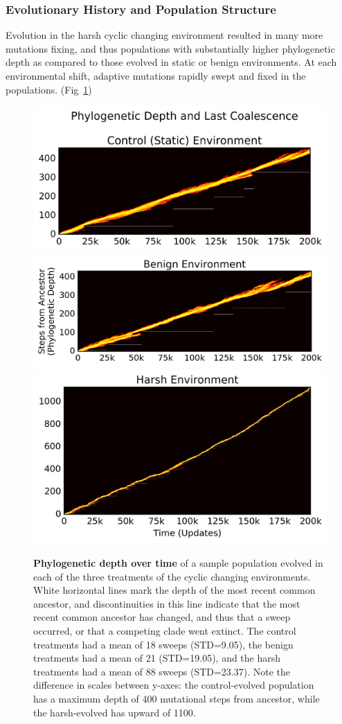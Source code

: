 \documentclass[PhD]{msu-thesis}
\begin{document}
\subsubsection{Evolutionary History and Population Structure}
Evolution in the harsh cyclic changing environment resulted in many more mutations fixing, and thus populations with substantially higher phylogenetic depth as compared to those evolved in static or benign environments. At each environmental shift, adaptive mutations rapidly swept and fixed in the populations. (Fig~\ref{fig:flamegraph})

\begin{figure}[!h]
\includegraphics[trim={-0.88cm 0 0.25cm 0},clip,width=0.65\columnwidth]{figures/CE/control__phylodepth_with_coalescense.png}
\includegraphics[trim={0.2cm 0 0.25cm 0},clip,width=0.65\columnwidth]{figures/CE/benign__phylodepth_with_coalescense.png}
\includegraphics[trim={-0.63cm 0 0.25cm 0},clip,width=0.65\columnwidth]{figures/CE/harsh__phylodepth_with_coalescense.png}
\caption{\textbf{Phylogenetic depth over time} of a sample population evolved in each of the three treatments of the cyclic changing environments. White horizontal lines mark the depth of the most recent common ancestor, and discontinuities in this line indicate that the most recent common ancestor has changed, and thus that a sweep occurred, or that a competing clade went extinct. The control treatments had a mean of 18 sweeps (STD=9.05), the benign treatments had a mean of 21 (STD=19.05), and the harsh treatments had a mean of 88 sweeps (STD=23.37). Note the difference in scales between y-axes: the control-evolved population has a maximum depth of 400 mutational steps from ancestor, while the harsh-evolved has upward of 1100. %
}\label{fig:flamegraph}
\end{figure}
\end{document}
